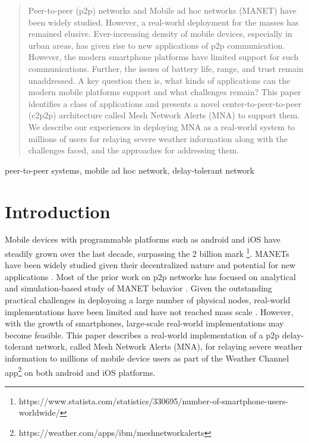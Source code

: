 \documentclass[conference]{IEEEtran}
\begin{document}
\begin{abstract}
Peer-to-peer (p2p) networks and Mobile ad hoc networks (MANET) have
been widely studied. However, a real-world deployment for the masses
has remained elusive. Ever-increasing density of mobile devices,
especially in urban areas, has given rise to new applications of p2p
communication. However, the modern smartphone platforms have limited
support for such communications. Further, the issues of battery life,
range, and trust remain unaddressed. A key question then is, what
kinds of applications can the modern mobile platforms support and what
challenges remain? This paper identifies a class of applications and
presents a novel center-to-peer-to-peer (c2p2p) architecture called
Mesh Network Alerts (MNA) to support them.  We describe our
experiences in deploying MNA as a real-world system to millions of
users for relaying severe weather information along with the
challenges faced, and the approaches for addressing them.
\end{abstract}

\begin{IEEEkeywords}
peer-to-peer systems, mobile ad hoc network, delay-tolerant network
\end{IEEEkeywords}

\section{Introduction}
Mobile devices with programmable platforms such as android and iOS
have steadily grown over the last decade, surpassing the 2 billion
mark \footnote{https://www.statista.com/statistics/330695/number-of-smartphone-users-worldwide/}. MANETs
have been widely studied given their decentralized nature and
potential for new applications
\cite{loo-manet-2011,perkins-ad-hoc-2001}. Most of the prior work on
p2p networks has focused on analytical and simulation-based study of
MANET behavior
\cite{zhang-topology-manet-2015,marti-misbehavior-manet-2000,mauve-pos-routing-manet-2001}. Given
the outstanding practical challenges in deployoing a large number of
physical nodes, real-world implementations have been limited and have
not reached mass scale \cite{kiess-manet-impl-2007}. However, with the
growth of smartphones, large-scale real-world implementations may
become feasible. This paper describes a real-world implementation of a
p2p delay-tolerant network, called Mesh Network Alerts (MNA), for
relaying severe weather information to millions of mobile device users
as part of the Weather Channel
app\footnote{https://weather.com/apps/ibm/meshnetworkalerts} on both
android and iOS platforms. 
\end{document}
